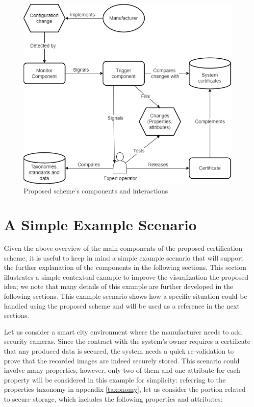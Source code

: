 \begin{figure}[ht]
    \centering
    \includegraphics[scale=0.7]{images/components.png}
    \caption{Proposed scheme's components and interactions}
    \label{fig:comps}
\end{figure}


\section{A Simple Example Scenario}
\label{scenario}
Given the above overview of the main components of the proposed certification scheme, it is useful to keep in mind a simple example scenario that will support the further explanation of the components in the following sections.
This section illustrates a simple contextual example to improve the visualization the proposed idea; we note that many details of this example are further developed in the following sections. This example scenario shows how a specific situation could be handled using the proposed scheme and will be used as a reference in the next sections.

Let us consider a smart city environment where the manufacturer needs to add security cameras. Since the contract with the system's owner requires a certificate that any produced data is secured, the system needs a quick re-validation to prove that the recorded images are indeed securely stored. This scenario could involve many properties, however, only two of them and one attribute for each property will be considered in this example for simplicity: referring to the properties taxonomy in appendix \ref{taxonomy}, let us consider the portion related to secure storage, which includes the following properties and attributes:

